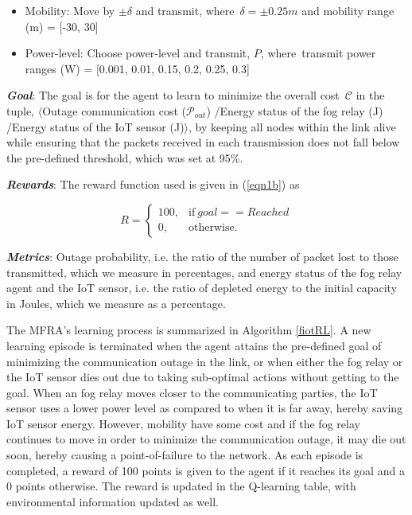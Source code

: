 \documentclass[journal]{IEEEtran}
\begin{document}
 \begin{itemize}
  \item Mobility: Move by $\pm \delta$ and transmit, where~$\delta = \pm0.25m$ and mobility range (m) = [-30, 30]
  \item Power-level: Choose power-level and transmit, $P$, where~transmit power ranges (W) = [0.001, 0.01, 0.15, 0.2, 0.25, 0.3]
\end{itemize}

\emph{\textbf{Goal}}: The goal is for the agent to learn to minimize the overall cost~$\mathcal{C}$ in the tuple, $\langle$Outage communication cost ($\mathcal{P}_{out}$) /Energy status of the fog relay (J) /Energy status of the IoT sensor (J)$\rangle$, by keeping all nodes within the link alive while ensuring that the packets received in each transmission does not fall below the pre-defined threshold, which was set at 95\%.

\emph{\textbf{Rewards}}: The reward function used is given in (\ref{eqn1b}) as

 \begin{equation}\label{eqn1b}
    R =
    \begin{cases}
      100, & \text{if}\ goal==Reached \\
      0, & \text{otherwise.}
    \end{cases}
  \end{equation}


\emph{\textbf{Metrics}}: Outage probability, i.e. the ratio of the number of packet lost to those transmitted, which we measure in percentages, and energy status of the fog relay agent and the IoT sensor, i.e. the ratio of depleted energy to the initial capacity in Joules, which we measure as a percentage.


The MFRA's learning process is summarized in Algorithm \ref{fiotRL}. A new learning episode is terminated when the agent attains the pre-defined goal of minimizing the communication outage in the link, or when either the fog relay or the IoT sensor dies out due to taking sub-optimal actions without getting to the goal. When an fog relay moves closer to the communicating parties, the IoT sensor uses a lower power level as compared to when it is far away, hereby saving IoT sensor energy. However, mobility have some cost and if the fog relay continues to move in order to minimize the communication outage, it may die out soon, hereby causing a point-of-failure to the network. As each episode is completed, a reward of 100 points is given to the agent if it reaches its goal and a 0 points otherwise. The reward is updated in the Q-learning table, with environmental information updated as well.
\end{document}
